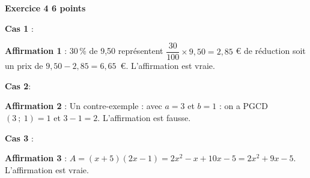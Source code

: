 \textbf{Exercice 4 \hfill 6 points}

\medskip

%
%
 
\textbf{Cas 1 }: %

  
\textbf{Affirmation 1 }: %
 30\,\% de 9,50 représentent $\dfrac{30}{100} \times 9,50 = 2,85$
\euro{} de réduction soit un prix de $9,50 - 2,85 = 6,65$~\euro. L’affirmation est vraie.

\medskip
 
\textbf{Cas 2}: %

\textbf{Affirmation 2 } : %
Un contre-exemple : avec $a = 3$ et $b = 1$ : on a PGCD$(3~;~1) = 1$ et $3 - 1 = 2$. L’affirmation est fausse.
\medskip
 
\textbf{Cas 3 }: %

\textbf{Affirmation 3 }: %
$A = (x + 5)(2x - 1) = 2x^2 - x + 10x - 5 = 2x^2 + 9x - 5$. L’affirmation est vraie. 
\bigskip

